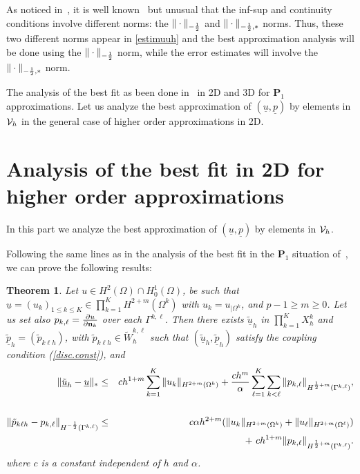 \documentclass[final]{siamltex}
\newtheorem{theo}{Theorem}
\begin{document}
As noticed in~\cite{JMN10}, it is well known~\cite{BB,BraessDahmen} but unusual that
the inf-sup and continuity conditions involve different norms: the
$\|\cdot\|_{-{1 \over 2}}$ and $\|\cdot\|_{-{1\over 2},*}$ norms. Thus, these two different norms
appear in \eqref{estimuuh} and the best approximation analysis will be done using 
the $\|\cdot\|_{-{1 \over 2}}$ norm, while the error estimates will involve the $\|\cdot\|_{-{1\over 2},*}$ norm.

The analysis of the best fit as been done in~\cite{JMN10} in 2D and 3D for
${\mathbf{P}}_1$ approximations. Let us analyze the best approximation of $({{\underline u}},{{\underline p}})$ by
elements in ${\cal V}_h$ in the general case of higher order approximations in 2D.

\section{Analysis of the best fit in 2D for higher order approximations}\label{sec.bestfit2D}
In this part we analyze the best approximation of $({{\underline u}},{{\underline p}})$ by
elements in ${\cal V}_h$.

Following the same lines as in the analysis of the best fit in the ${\mathbf{P}}_1$ situation of~\cite{JMN10},
we can prove the following results:
\begin{theo}
\label{best-fit}
Let $u \in H^2(\Omega)\cap H^1_0(\Omega)$, 
be such that ${{\underline u}}=(u_k)_{1\le k\le K}\in \prod_{k=1}^K H^{2+m}(\Omega^k)$ with  $u_k=u_{|\Omega^k}$,  and
$p-1\ge m \ge 0$. Let us set also
$p_{k,\ell}=\frac{\partial u}{\partial {\bf n}_k}$
over each $\Gamma^{k,\ell}$.
Then there exists $\tilde{{\underline u}}_h$ in
$\prod_{k=1}^K X_h^k$
and $\tilde{{\underline p}}_h=(\tilde{p}_{k \ell h})$, with $  \tilde{p}_{k \ell h}
\in \tilde W_h^{k,\ell}$
such that $(\tilde{{\underline u}}_h,\tilde{{\underline p}}_h)$ satisfy the coupling condition
(\ref{disc.const}), and
\begin{eqnarray}
\| \tilde{{\underline u}}_h -{{\underline u}}\|_*
&\le& c h^{1+m} \sum_{k=1}^K \| u_k \|_{H^{2+m}(\Omega^k)}
  +{c h^m \over \alpha} \sum_{\ell=1}^K\sum_{k < \ell} \| p_{k,\ell} \|_{H^{{1 \over
2}+m}(\Gamma^{k,\ell})},
\nonumber\\ \nonumber\\
\| \tilde{p}_{k \ell h} - p_{k,\ell} \|_{H^{-{1 \over 2}}(\Gamma^{k,\ell})}
&\le& c\alpha h^{2+m} (\|u_k\|_{H^{2+m}(\Omega^k)}
+\|u_{\ell}\|_{H^{2+m}(\Omega^{\ell})})
\nonumber\\
&& \qquad \qquad  \qquad \qquad\qquad\! + \ c h^{1+m} \| p_{k,\ell} \|_{H^{{1 \over 2}+m}(\Gamma^{k,\ell})}.
\nonumber
\end{eqnarray}
where $c$ is a constant independent of $h$ and $\alpha$.
\end{theo}
\end{document}
